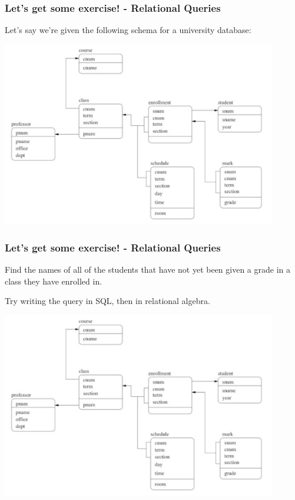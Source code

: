 \begin{frame}
\frametitle{Let's get some exercise! - Relational Queries}

Let's say we're given the following schema for a university database:

\begin{center}
  \includegraphics[width=0.9\textwidth]{images/db-schema.png}
\end{center}

\end{frame}


\begin{frame}
\frametitle{Let's get some exercise! - Relational Queries}

Find the names of all of the students that have not yet been given a grade in a class they have enrolled in.

Try writing the query in SQL, then in relational algebra.

\begin{center}
  \includegraphics[width=0.9\textwidth]{images/db-schema.png}
\end{center}

\end{frame}


